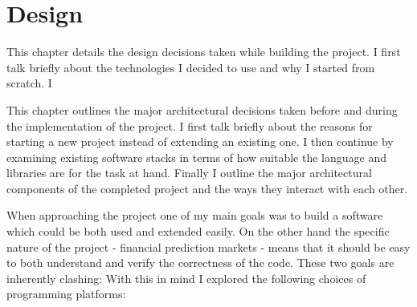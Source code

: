 \documentclass[bsc,frontabs,twoside,singlespacing,parskip,deptreport]{infthesis}     %
\begin{document}
\section{Design}
	This chapter details the design decisions taken while building the project. I first talk briefly about the technologies I decided to use and why I started from scratch. I 

	This chapter outlines the major architectural decisions taken before and during the implementation of the project. I first talk briefly about the reasons for starting a new project instead of extending an existing one. I then continue by examining existing software stacks in terms of how suitable the language and libraries are for the task at hand. Finally I outline the major architectural components of the completed project and the ways they interact with each other. 

	When approaching the project one of my main goals was to build a software which could be both used and extended easily. On the other hand the specific nature of the project - financial prediction markets - means that it should be easy to both understand and verify the correctness of the code. These two goals are inherently clashing: 
With this in mind I explored the following choices of programming platforms:
\end{document}
